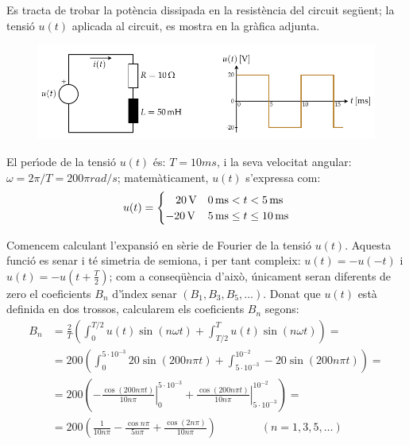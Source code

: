 \begin{exemple}

 Es tracta de trobar la pot\`{e}ncia
 dissipada en la resist\`{e}ncia del circuit seg\"{u}ent; la tensi\'{o} $u(t)$ aplicada al circuit,
 es mostra en la gr\`{a}fica adjunta.

\begin{figure}[h]
\centering
    \includegraphics{Imatges/Cap-Fourier-Exemple-Circuit.pdf}
\end{figure}

 El per\'{\i}ode de la tensi\'{o} $u(t)$ \'{e}s: $T=10\unit{ms}$, i la
seva velocitat angular: $\omega = 2\pi/T = 200\pi\unit{rad/s}$;
matem\`{a}ticament, $u(t)$ s'expressa com:
\[
u(t) = \begin{cases} \rule{3.2mm}{0pt} 20\unit{V} & 0\unit{ms} < t < 5\unit{ms} \\
       -20\unit{V} & 5\unit{ms} \leq t \leq 10\unit{ms} \end{cases}
\]

Comencem calculant l'expansi\'{o} en s\`{e}rie de Fourier de la tensi\'{o}
$u(t)$. Aquesta funci\'{o} es senar i t\'{e} simetria de semiona, i per tant
 compleix: $u(t)=-u(-t)$ i $u(t) = -u(t+\frac{T}{2})$; com a
conseq\"{u}\`{e}ncia d'aix\`{o}, \'{u}nicament seran diferents de zero el
coeficients $B_n$ d'\'{\i}ndex senar $(B_1,B_3,B_5,\ldots)$. Donat que
$u(t)$ est\`{a} definida en dos trossos, calcularem els coeficients
$B_n$ segons:
\[
\begin{split}
    B_n &= \frac{2}{T} \left( \int_0^{T/2} u(t) \sin(n \omega t) +
    \int_{T/2}^{T} u(t) \sin(n \omega t) \right) =\\[0.5ex]
    &= 200 \left( \int_0^{5\cdot 10^{-3}} 20 \sin(200 n \pi t) +
    \int_{5\cdot 10^{-3}}^{10^{-2}} -20 \sin(200 n \pi t) \right) =\\[0.5ex]
    &= 200 \left( \left. -\frac{\cos(200 n \pi t)}{10 n \pi}\right|_0^{5\cdot 10^{-3}}
    +  \left.\frac{\cos(200 n \pi t)}{10 n \pi}\right|_{5\cdot
    10^{-3}}^{10^{-2}}\right)=\\[0.5ex]
    &= 200\left( \frac{1}{10 n \pi} - \frac{\cos n \pi}{5 n \pi} +
    \frac{\cos (2 n \pi)}{10 n \pi}\right)
    \qquad\qquad(n=1,3,5,\ldots)
\end{split}
\]


\end{exemple}
